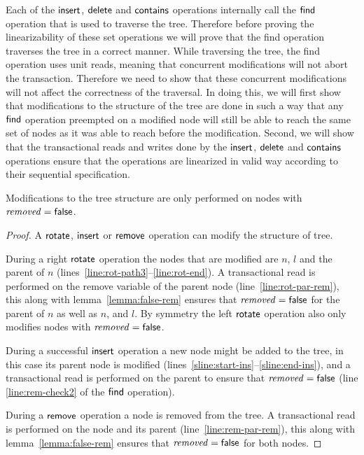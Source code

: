 Each of the $\act{insert}$, $\act{delete}$ and $\act{contains}$ operations internally call the $\act{find}$ operation
that is used to traverse the tree.
Therefore before proving the linearizability of these set operations we will prove that the find operation traverses
the tree in a correct manner.
While traversing the tree, the find operation uses unit reads, meaning that concurrent modifications will not abort the transaction.
Therefore we need to show that these concurrent modifications will not affect the correctness of the traversal.
In doing this, we will first show that modifications to the structure of the tree are done in such a way that
any $\act{find}$ operation preempted on a modified node will still be able to reach the same set of nodes as it was able to reach before the modification.
Second, we will show that the transactional reads and writes done by the $\act{insert}$, $\act{delete}$ and $\act{contains}$
operations ensure that the operations are linearized in valid way according to their sequential specification.


\begin{lemma}
\label{lemma:mods}
Modifications to the tree structure are only performed on nodes with $\ms{removed}=\lit{false}$.
\end{lemma}
\begin{proof}
A $\act{rotate}$, $\act{insert}$ or $\act{remove}$ operation can modify the structure of tree.

During a right $\act{rotate}$ operation the nodes that are modified are $n$, $l$ and the parent of $n$ (lines~\ref{line:rot-path3}--\ref{line:rot-end}).
A transactional read is performed on the remove variable of the parent node (line~\ref{line:rot-par-rem}), this along with lemma~\ref{lemma:false-rem} ensures 
that $\ms{removed}=\lit{false}$ for the parent of $n$ as well as $n$, and $l$.
By symmetry the left $\act{rotate}$ operation also only modifies nodes with $\ms{removed}=\lit{false}$.

During a successful $\act{insert}$ operation a new node might be added to the tree, in this case its parent node is modified (lines~\ref{sline:start-ins}--\ref{sline:end-ins}), and
a transactional read is performed on the parent to ensure that $\ms{removed}=\lit{false}$ (line \ref{line:rem-check2} of the $\act{find}$ operation).

During a $\act{remove}$ operation a node is removed from the tree.
A transactional read is performed on the node and its parent (line~\ref{line:rem-par-rem}), this along with lemma~\ref{lemma:false-rem} ensures that $\ms{removed}=\lit{false}$ for both nodes.
\end{proof}





